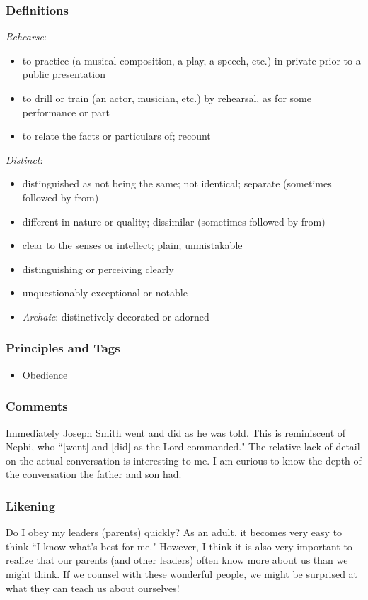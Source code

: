 \documentclass[12pt]{report}
\begin{document}
\subsubsection{Definitions\label{js:DFN17}}
\emph{Rehearse}: \begin{itemize}
\item to practice (a musical composition, a play, a speech, etc.) in private prior to a public presentation
\item to drill or train (an actor, musician, etc.) by rehearsal, as for some performance or part
\item to relate the facts or particulars of; recount
\end{itemize}
\emph{Distinct}: \begin{itemize}
\item distinguished as not being the same; not identical; separate (sometimes followed by from)
\item different in nature or quality; dissimilar (sometimes followed by from)
\item clear to the senses or intellect; plain; unmistakable
\item distinguishing or perceiving clearly
\item unquestionably exceptional or notable
\item \emph{Archaic}: distinctively decorated or adorned
\end{itemize}

\subsubsection{Principles and Tags\label{js:principles17}}
\begin{itemize}
\item {}Obedience
\end{itemize}

\subsubsection{Comments\label{js:comments17}}
Immediately Joseph Smith went and did as he was told.  This is reminiscent of Nephi, who ``[went] and [did] as the Lord commanded."  The relative lack of detail on the actual conversation is interesting to me.  I am curious to know the depth of the conversation the father and son had.

\subsubsection{Likening\label{js:likening17}}
Do I obey my leaders (parents) quickly?  As an adult, it becomes very easy to think ``I know what's best for me."  However, I think it is also very important to realize that our parents (and other leaders) often know more about us than we might think.  If we counsel with these wonderful people, we might be surprised at what they can teach us about ourselves!
\end{document}
